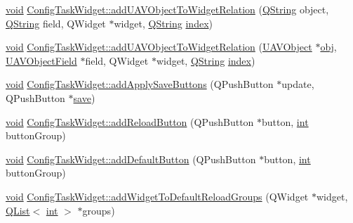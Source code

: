\begin{DoxyCompactItemize}
\item 
\hyperlink{group___u_a_v_objects_plugin_ga444cf2ff3f0ecbe028adce838d373f5c}{void} \hyperlink{group___u_a_v_object_widget_utils_gae3ae5288613fb8062c029d9a4da6c759}{Config\-Task\-Widget\-::add\-U\-A\-V\-Object\-To\-Widget\-Relation} (\hyperlink{group___u_a_v_objects_plugin_gab9d252f49c333c94a72f97ce3105a32d}{Q\-String} object, \hyperlink{group___u_a_v_objects_plugin_gab9d252f49c333c94a72f97ce3105a32d}{Q\-String} field, Q\-Widget $\ast$widget, \hyperlink{group___u_a_v_objects_plugin_gab9d252f49c333c94a72f97ce3105a32d}{Q\-String} \hyperlink{glext_8h_ab47dd9958bcadea08866b42bf358e95e}{index})
\item 
\hyperlink{group___u_a_v_objects_plugin_ga444cf2ff3f0ecbe028adce838d373f5c}{void} \hyperlink{group___u_a_v_object_widget_utils_ga368867adfb58200a5f6af90141e8f1ae}{Config\-Task\-Widget\-::add\-U\-A\-V\-Object\-To\-Widget\-Relation} (\hyperlink{class_u_a_v_object}{U\-A\-V\-Object} $\ast$\hyperlink{glext_8h_a0c0d4701a6c89f4f7f0640715d27ab26}{obj}, \hyperlink{class_u_a_v_object_field}{U\-A\-V\-Object\-Field} $\ast$field, Q\-Widget $\ast$widget, \hyperlink{group___u_a_v_objects_plugin_gab9d252f49c333c94a72f97ce3105a32d}{Q\-String} \hyperlink{glext_8h_ab47dd9958bcadea08866b42bf358e95e}{index})
\item 
\hyperlink{group___u_a_v_objects_plugin_ga444cf2ff3f0ecbe028adce838d373f5c}{void} \hyperlink{group___u_a_v_object_widget_utils_ga38c270f9a29f4e190e71414bdce82590}{Config\-Task\-Widget\-::add\-Apply\-Save\-Buttons} (Q\-Push\-Button $\ast$update, Q\-Push\-Button $\ast$\hyperlink{uavobjecttemplate_8m_a79178933c5b76091ca04178d14a5ba98}{save})
\item 
\hyperlink{group___u_a_v_objects_plugin_ga444cf2ff3f0ecbe028adce838d373f5c}{void} \hyperlink{group___u_a_v_object_widget_utils_ga08a7e3f2686fdb1ef91db0843cb9414e}{Config\-Task\-Widget\-::add\-Reload\-Button} (Q\-Push\-Button $\ast$button, \hyperlink{ioapi_8h_a787fa3cf048117ba7123753c1e74fcd6}{int} button\-Group)
\item 
\hyperlink{group___u_a_v_objects_plugin_ga444cf2ff3f0ecbe028adce838d373f5c}{void} \hyperlink{group___u_a_v_object_widget_utils_gac0e04866c45a89a3f2c6f3241afa86d3}{Config\-Task\-Widget\-::add\-Default\-Button} (Q\-Push\-Button $\ast$button, \hyperlink{ioapi_8h_a787fa3cf048117ba7123753c1e74fcd6}{int} button\-Group)
\item 
\hyperlink{group___u_a_v_objects_plugin_ga444cf2ff3f0ecbe028adce838d373f5c}{void} \hyperlink{group___u_a_v_object_widget_utils_gabdd18a22aae23df220d48868ecbdf3a0}{Config\-Task\-Widget\-::add\-Widget\-To\-Default\-Reload\-Groups} (Q\-Widget $\ast$widget, \hyperlink{class_q_list}{Q\-List}$<$ \hyperlink{ioapi_8h_a787fa3cf048117ba7123753c1e74fcd6}{int} $>$ $\ast$groups)

\end{DoxyCompactItemize}
